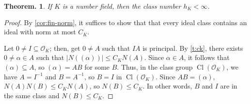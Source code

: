\documentclass[11pt, a4paper]{memoir}
\theoremstyle{change}
\newtheorem{theorem}{Theorem.}[section]
\theoremstyle{plain}
\theoremstyle{nonumberplain}
\newtheorem{proof}{Proof}
\DeclareMathOperator{\Cl}{Cl}
\numberwithin{equation}{section}
\begin{document}
\begin{theorem}\label{t:cl-bound}
    If $K$ is a number field, then the class number $h_K<\infty$.
\end{theorem}
\begin{proof}
    By \cref{cor:fin-norm}, it suffices to show that that every ideal class contains an ideal with norm at most $C_K$.

    Let $0\neq I\subseteq\mathcal{O}_K$; then, get $0\neq A$ such that $IA$ is principal.
    By \cref{t:ck}, there exists $0\neq\alpha\in A$ such that $|N((\alpha))|\leq C_KN(A)$.
    Since $\alpha\in A$, it follows that $(\alpha)\subseteq A$, so $(\alpha)=AB$ for some $B$.
    Thus, in the class group $\Cl(\mathcal{O}_K)$, we have $A=I^{-1}$ and $B=A^{-1}$, so $B=I$ in $\Cl(\mathcal{O}_K)$.
    Since $AB=(\alpha)$, $N(A)N(B)\leq C_KN(A)$, so $N(B)\leq C_K$.
    In other words, $B$ and $I$ are in the same class and $N(B)\leq C_K$.
\end{proof}
\end{document}
